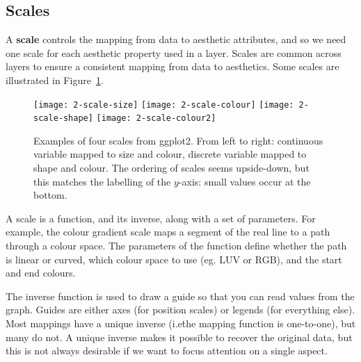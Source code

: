 \subsection{Scales}\label{sec:scales}

A {\bf scale} controls the mapping from data to aesthetic attributes, and so we need one scale for each aesthetic property used in a layer.  Scales are common across layers to ensure a consistent mapping from data to aesthetics.  Some scales are illustrated in Figure~\ref{fig:scales}.

\begin{figure}[htbp]
	\centering
	\texttt{[image: 2-scale-size]}
	\texttt{[image: 2-scale-colour]}
	\texttt{[image: 2-scale-shape]}
	\texttt{[image: 2-scale-colour2]}
	\caption{Examples of four scales from ggplot2.  From left to right: continuous variable mapped to size and colour, discrete variable mapped to shape and colour.  The ordering of scales seems upside-down, but this matches the labelling of the $y$-axis: small values occur at the bottom.}
	\label{fig:scales}
\end{figure}



A scale is a function, and its inverse, along with a set of parameters.  For example, the colour gradient scale maps a segment of the real line to a path through a colour space.  The parameters of the function define whether the path is linear or curved, which colour space to use (eg. LUV or RGB), and the start and end colours.  

The inverse function is used to draw a guide so that you can read values from the graph.  Guides are either axes (for position scales) or legends (for everything else).  Most mappings have a unique inverse (i.e\. the mapping function is one-to-one), but many do not.  A unique inverse makes it possible to recover the original data, but this is not always desirable if we want to focus attention on a single aspect.

